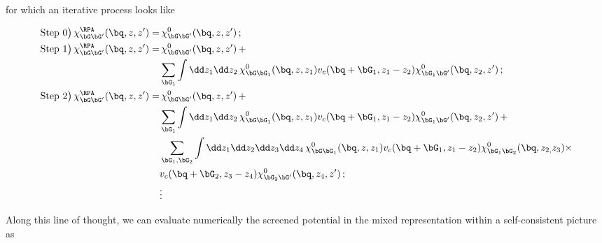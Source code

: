 \noindent for which an iterative process looks like

\begin{align}
\text{Step 0\big)}\,\chi^{\RPA}_{\bG \bG'}(\bq,z,z') =  & \,\chi^{0}_{\bG \bG'}(\bq,z,z') \,; \notag \\
\text{Step 1\big)}\,\chi^{\RPA}_{\bG \bG'}(\bq,z,z') =  & \,\chi^{0}_{\bG \bG'}(\bq,z,z')\, +  \notag \\
&\sum_{\bG_{1}}\int\dd z_{1} \dd z_{2}\,\chi^{0}_{\bG \bG_{1}}(\bq,z,z_{1})v_{c}( \bq +\bG_{1},z_{1}-z_{2})\chi^{0}_{\bG_{1} \bG'}(\bq,z_{2},z') \,; \notag \\
\text{Step 2\big)}\,\chi^{\RPA}_{\bG \bG'}(\bq,z,z') =  & \,\chi^{0}_{\bG \bG'}(\bq,z,z')\,+  \notag \\
 &\sum_{\bG_{1}}\int\dd z_{1} \dd z_{2}\,\chi^{0}_{\bG \bG_{1}}(\bq,z,z_{1})v_{c}( \bq +\bG_{1},z_{1}-z_{2})\chi^{0}_{\bG_{1} \bG'}(\bq,z_{2},z')\,+ \notag \\
 & \sum_{\bG_{1}, \bG_{2}} \int \dd z_{1} \dd z_{2} \dd z_{3} \dd z_{4}\,\chi^{0}_{\bG \bG_{1}}(\bq,z,z_{1})v_{c}( \bq +\bG_{1},z_{1}-z_{2})\chi^{0}_{\bG_{1} \bG_{2}}(\bq,z_{2,}z_{3})\times \notag \\
 & v_{c}( \bq +\bG_{2},z_{3}-z_{4})\chi^{0}_{\bG_{2} \bG'}(\bq,z_{4},z') \,; \\
 & \vdots \notag
\end{align}


\noindent Along this line of thought, we can evaluate numerically the screened potential in the mixed representation within a self-consistent picture as

